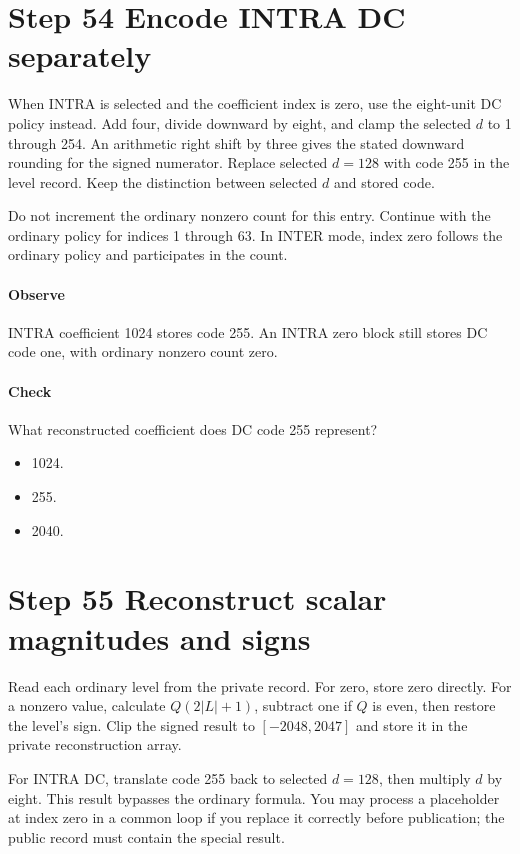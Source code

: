 \section{Step 54 Encode INTRA DC separately}\label{h263-quant-s04}
When INTRA is selected and the coefficient index is zero, use the eight-unit DC
policy instead. Add four, divide downward by eight, and clamp the selected $d$
to 1 through 254. An arithmetic right shift by three gives the stated downward
rounding for the signed numerator. Replace selected $d=128$ with code 255 in
the level record. Keep the distinction between selected $d$ and stored code.

Do not increment the ordinary nonzero count for this entry. Continue with the
ordinary policy for indices 1 through 63. In INTER mode, index zero follows the
ordinary policy and participates in the count.

\paragraph{Observe} INTRA coefficient 1024 stores code 255. An INTRA zero
block still stores DC code one, with ordinary nonzero count zero.
\paragraph{Check} What reconstructed coefficient does DC code 255 represent?
\begin{itemize}
  \item[A.] 1024.
  \item[B.] 255.
  \item[C.] 2040.
\end{itemize}

\section{Step 55 Reconstruct scalar magnitudes and signs}\label{h263-quant-s05}
Read each ordinary level from the private record. For zero, store zero directly.
For a nonzero value, calculate $Q(2|L|+1)$, subtract one if $Q$ is even, then
restore the level's sign. Clip the signed result to $[-2048,2047]$ and store it
in the private reconstruction array.

For INTRA DC, translate code 255 back to selected $d=128$, then multiply $d$ by
eight. This result bypasses the ordinary formula. You may process a placeholder
at index zero in a common loop if you replace it correctly before publication;
the public record must contain the special result.

